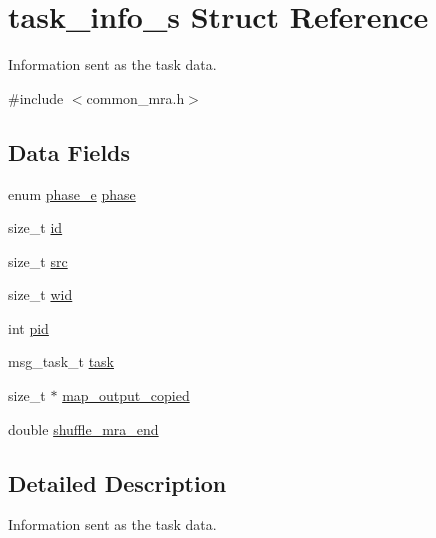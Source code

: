 \hypertarget{structtask__info__s}{\section{task\-\_\-info\-\_\-s \-Struct \-Reference}
\label{structtask__info__s}
}


\-Information sent as the task data.  




{\ttfamily \#include $<$common\-\_\-mra.\-h$>$}

\subsection*{\-Data \-Fields}
\begin{DoxyCompactItemize}
\item 
enum \hyperlink{mra_8h_afa14b6e068c0e0b8557777e16f2582f2}{phase\-\_\-e} \hyperlink{structtask__info__s_afa72d514e04545e1916981f970178902}{phase}
\item 
size\-\_\-t \hyperlink{structtask__info__s_a4974ced5dfb8d5d2ab72351cc12e1bb6}{id}
\item 
size\-\_\-t \hyperlink{structtask__info__s_a80e71f08fc31bfe88a8c546f0e8155d7}{src}
\item 
size\-\_\-t \hyperlink{structtask__info__s_a7b70c65e767769e2a42e6c5978c2c669}{wid}
\item 
int \hyperlink{structtask__info__s_abf5e8401c80afb200b761ed7207cfcea}{pid}
\item 
msg\-\_\-task\-\_\-t \hyperlink{structtask__info__s_a852100955a5ed323f31c670ef596787c}{task}
\item 
size\-\_\-t $\ast$ \hyperlink{structtask__info__s_a89d391613219da550d84283a89461bf4}{map\-\_\-output\-\_\-copied}
\item 
double \hyperlink{structtask__info__s_a3f07b243958c81aab30d87f2f8aa63c3}{shuffle\-\_\-mra\-\_\-end}
\end{DoxyCompactItemize}


\subsection{\-Detailed \-Description}
\-Information sent as the task data. 

